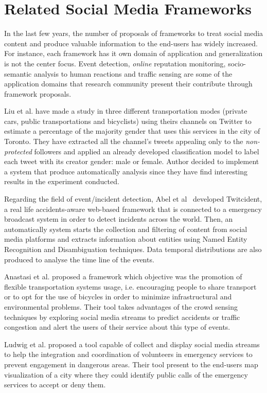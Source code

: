 \section{Related Social Media Frameworks}

In the last few years, the number of proposals of frameworks to treat social media content and produce valuable information to the end-users has widely increased. For instance, each framework has it own domain of application and generalization is not the center focus. Event detection, \textit{online} reputation monitoring, socio-semantic analysis to human reactions and traffic sensing are some of the application domains that research community present their contribute through framework proposals.

Liu et al. \cite{kn:Liu2012} have made a study in three different transportation modes (private cars, public transportations and bicyclists) using theirs channels on Twitter to estimate a percentage of the majority gender that uses this services in the city of Toronto. They have extracted all the channel's tweets appealing only to the \textit{non-protected} followers and applied an already developed classification model to label each tweet with its creator gender: male or female. Author decided to implement a system that produce automatically analysis since they have find interesting results in the experiment conducted.

Regarding the field of event/incident detection, Abel et al~\cite{kn:Abel2012} developed Twitcident, a real life accidents-aware web-based framework that is connected to a emergency broadcast system in order to detect incidents across the world. Then, an automatically system starts the collection and filtering of content from social media platforms and extracts information about entities using Named Entity Recognition and Disambiguation techniques. Data temporal distributions are also produced to analyse the time line of the events.

Anastasi et al. \cite{kn:Anastasi2013} proposed a framework which objective was the promotion of flexible transportation systems usage, i.e. encouraging people to share transport or to opt for the use of bicycles in order to minimize infrastructural and environmental problems. Their tool takes advantages of the crowd sensing techniques by exploring social media streams to predict accidents or traffic congestion and alert the users of their service about this type of events.

Ludwig et al. \cite{kn:Ludwig2015} proposed a tool capable of collect and display social media streams to help the integration and coordination of volunteers in emergency services to prevent engagement in dangerous areas. Their tool present to the end-users map visualization of a city where they could identify public calls of the emergency services to accept or deny them.

